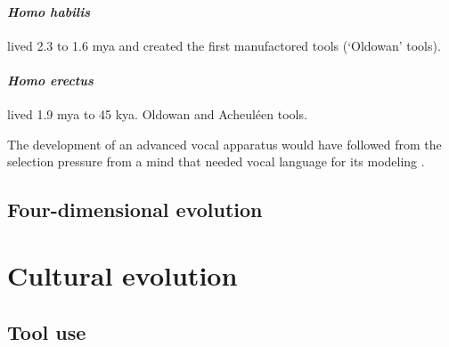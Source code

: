 \documentclass{article}
\begin{document}
\paragraph{\textit{Homo habilis}} lived 2.3 to 1.6 mya and created the first manufactored tools (`Oldowan' tools).

\paragraph{\textit{Homo erectus}} lived 1.9 mya to 45 kya.
Oldowan and Acheuléen tools.

The development of an advanced vocal apparatus would have followed from the selection pressure from a mind that needed vocal language for its modeling \citep[p.220]{donald1991}.

\subsection{Four-dimensional evolution}

\citet{jablonka2007}


\section{Cultural evolution}
\label{sec:cultural_evolution}

\subsection{Tool use}
\label{sec:tool-use}





\end{document}

